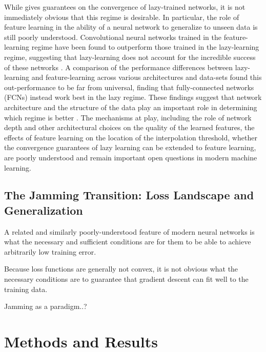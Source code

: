 \documentclass[a4paper, 12pt]{article}
\begin{document}
 While \cite{allen-zhuConvergenceTheoryDeep2019} gives guarantees on the convergence of lazy-trained networks, it is not immediately obvious that this regime is desirable. In particular, the role of feature learning in the ability of a neural network to generalize to unseen data is still poorly understood. Convolutional neural networks trained in the feature-learning regime have been found to outperform those trained in the lazy-learning regime, suggesting that lazy-learning does not account for the incredible success of these networks \cite{chizatLazyTrainingDifferentiable2020}. A comparison of the performance differences between lazy-learning and feature-learning across various architectures and data-sets found this out-performance to be far from universal, finding that fully-connected networks (FCNs) instead work best in the lazy regime. These findings suggest that network architecture and the structure of the data play an important role in determining which regime is better \cite{geigerDisentanglingFeatureLazy2020}. The mechanisms at play, including the role of network depth and other architectural choices on the quality of the learned features, the effects of feature learning on the location of the interpolation threshold, whether the convergence guarantees of lazy learning can be extended to feature learning, are poorly understood and remain important open questions in modern machine learning.











\subsection{The Jamming Transition: Loss Landscape and Generalization}

A related and similarly poorly-understood feature of modern neural networks is what the necessary and sufficient conditions are for them to be able to achieve arbitrarily low training error. 

Because loss functions are generally not convex, it is not obvious what the necessary conditions are to guarantee that gradient descent can fit well to the training data. 


Jamming as a paradigm..?

\section{Methods and Results}
\end{document}
